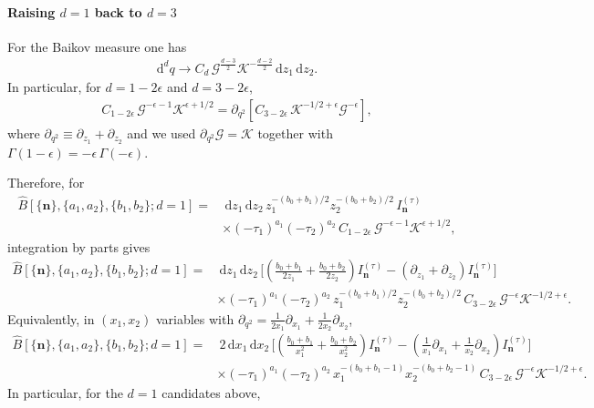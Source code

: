 \documentclass[a4paper,12pt]{article}
\newcommand{\n}{\nonumber}
\def\di{{\mathrm{d}}}
\def\ep{\epsilon}
\newcommand{\mG}{\mathcal{G}}
\newcommand{\mK}{\mathcal{K}}
\def\to{\rightarrow}
\begin{document}
\paragraph{Raising $d=1$ back to $d=3$}
For the Baikov measure one has
\begin{align}
	\di^d q \to C_d\,\mG^{\frac{d-3}{2}}\mK^{-\frac{d-2}{2}}\,\di z_1\,\di z_2.
\end{align}
In particular, for $d=1-2\ep$ and $d=3-2\ep$,
\begin{align}
	C_{1-2\ep}\,\mG^{-\ep-1}\mK^{\ep+1/2}
	= \partial_{q^2}\!\left[C_{3-2\ep}\,\mK^{-1/2+\ep}\mG^{-\ep}\right],
\end{align}
where $\partial_{q^2}\equiv\partial_{z_1}+\partial_{z_2}$ and we used $\partial_{q^2}\mG=\mK$ together with $\Gamma(1-\ep)=-\ep\,\Gamma(-\ep)$.

Therefore, for
\begin{align}
	\hat{B}[\{\bm n\},\{a_1,a_2\},\{b_1,b_2\};d=1]
	=&~\di z_1\,\di z_2\,z_1^{-(b_0+b_1)/2}z_2^{-(b_0+b_2)/2}\,I^{(\tau)}_{\bm n}\,\n\\
	&\times (-\tau_1)^{a_1}(-\tau_2)^{a_2}\,C_{1-2\ep}\,\mG^{-\ep-1}\mK^{\ep+1/2},
\end{align}
integration by parts gives
\begin{align}
	\hat{B}[\{\bm n\},\{a_1,a_2\},\{b_1,b_2\};d=1]
	=&~\di z_1\,\di z_2\,\Bigg[\left(\frac{b_0+b_1}{2z_1}+\frac{b_0+b_2}{2z_2}\right)I^{(\tau)}_{\bm n}
	-\left(\partial_{z_1}+\partial_{z_2}\right)I^{(\tau)}_{\bm n}\Bigg] \n\\
	&\times (-\tau_1)^{a_1}(-\tau_2)^{a_2}\,z_1^{-(b_0+b_1)/2}z_2^{-(b_0+b_2)/2}\,
	C_{3-2\ep}\,\mG^{-\ep}\mK^{-1/2+\ep}.
\end{align}
Equivalently, in $(x_1,x_2)$ variables with $\partial_{q^2}=\frac{1}{2x_1}\partial_{x_1}+\frac{1}{2x_2}\partial_{x_2}$,
\begin{align}
	\hat{B}[\{\bm n\},\{a_1,a_2\},\{b_1,b_2\};d=1]
	=&~2\,\di x_1\,\di x_2\,\Bigg[\left(\frac{b_0+b_1}{x_1^2}+\frac{b_0+b_2}{x_2^2}\right)I^{(\tau)}_{\bm n}
	-\left(\frac{1}{x_1}\partial_{x_1}+\frac{1}{x_2}\partial_{x_2}\right)I^{(\tau)}_{\bm n}\Bigg] \n\\
	&\times (-\tau_1)^{a_1}(-\tau_2)^{a_2}\,x_1^{-(b_0+b_1-1)}x_2^{-(b_0+b_2-1)}\,
	C_{3-2\ep}\,\mG^{-\ep}\mK^{-1/2+\ep}.
\end{align}
In particular, for the $d=1$ candidates above,
\end{document}
